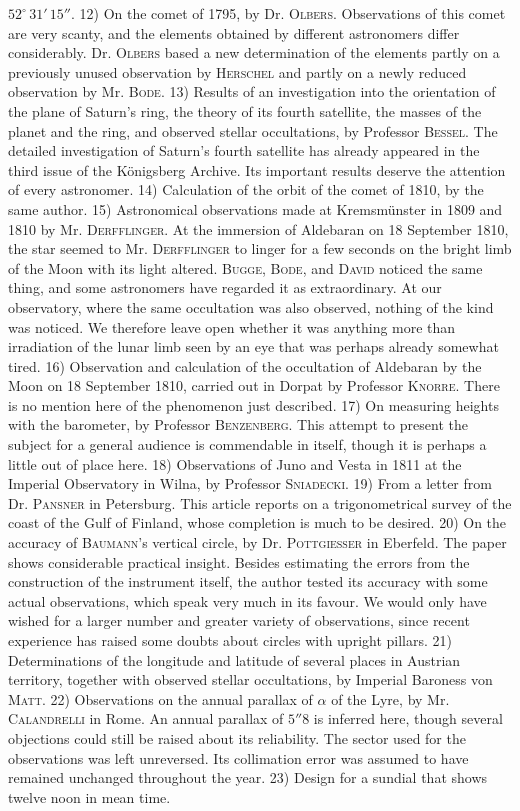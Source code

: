 $52^\circ\,31'\,15''$. 12) On the comet of 1795, by Dr. \textsc{Olbers}. Observations of this comet are very scanty, and the elements obtained by different astronomers differ considerably. Dr. \textsc{Olbers} based a new determination of the elements partly on a previously unused observation by \textsc{Herschel} and partly on a newly reduced observation by Mr. \textsc{Bode}. 13) Results of an investigation into the orientation of the plane of Saturn's ring, the theory of its fourth satellite, the masses of the planet and the ring, and observed stellar occultations, by Professor \textsc{Bessel}. The detailed investigation of Saturn's fourth satellite has already appeared in the third issue of the Königsberg Archive. Its important results deserve the attention of every astronomer. 14) Calculation of the orbit of the comet of 1810, by the same author. 15) Astronomical observations made at Kremsmünster in 1809 and 1810 by Mr. \textsc{Derfflinger}. At the immersion of Aldebaran on 18 September 1810, the star seemed to Mr. \textsc{Derfflinger} to linger for a few seconds on the bright limb of the Moon with its light altered. \textsc{Bugge}, \textsc{Bode}, and \textsc{David} noticed the same thing, and some astronomers have regarded it as extraordinary. At our observatory, where the same occultation was also observed, nothing of the kind was noticed. We therefore leave open whether it was anything more than irradiation of the lunar limb seen by an eye that was perhaps already somewhat tired. 16) Observation and calculation of the occultation of Aldebaran by the Moon on 18 September 1810, carried out in Dorpat by Professor \textsc{Knorre}. There is no mention here of the phenomenon just described. 17) On measuring heights with the barometer, by Professor \textsc{Benzenberg}. This attempt to present the subject for a general audience is commendable in itself, though it is perhaps a little out of place here. 18) Observations of Juno and Vesta in 1811 at the Imperial Observatory in Wilna, by Professor \textsc{Sniadecki}. 19) From a letter from Dr. \textsc{Pansner} in Petersburg. This article reports on a trigonometrical survey of the coast of the Gulf of Finland, whose completion is much to be desired. 20) On the accuracy of \textsc{Baumann}'s vertical circle, by Dr. \textsc{Pottgiesser} in Eberfeld. The paper shows considerable practical insight. Besides estimating the errors from the construction of the instrument itself, the author tested its accuracy with some actual observations, which speak very much in its favour. We would only have wished for a larger number and greater variety of observations, since recent experience has raised some doubts about circles with upright pillars. 21) Determinations of the longitude and latitude of several places in Austrian territory, together with observed stellar occultations, by Imperial Baroness von \textsc{Matt}. 22) Observations on the annual parallax of $\alpha$ of the Lyre, by Mr. \textsc{Calandrelli} in Rome. An annual parallax of $5''8$ is inferred here, though several objections could still be raised about its reliability. The sector used for the observations was left unreversed. Its collimation error was assumed to have remained unchanged throughout the year. 23) Design for a sundial that shows twelve noon in mean time. 